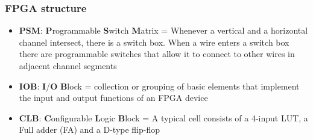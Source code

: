 \documentclass[aspectratio=169]{beamer}
\begin{document}
	\begin{frame}[noframenumbering]
		\frametitle{FPGA structure}
		\begin{itemize}
			\item \textbf{PSM}: \textbf{P}rogrammable \textbf{S}witch \textbf{M}atrix = Whenever a vertical and a horizontal channel intersect, there is a switch box. When a wire enters a switch box there are programmable switches that allow it to connect to other wires in adjacent channel segments
			\item \textbf{IOB}: \textbf{I}/\textbf{O} \textbf{B}lock = collection or grouping of basic elements that implement the input and output functions of an FPGA device
			\item \textbf{CLB}: \textbf{C}onfigurable \textbf{L}ogic \textbf{B}lock = A typical cell consists of a 4-input LUT, a Full adder (FA) and a D-type flip-flop
		\end{itemize}
	\end{frame}

		
	
\end{document}
